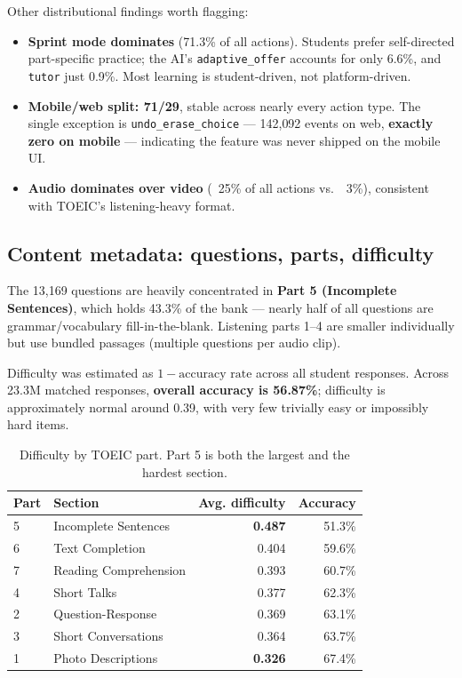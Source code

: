 Other distributional findings worth flagging:

\begin{itemize}
\setlength\itemsep{1pt}
\item \textbf{Sprint mode dominates} (71.3\% of all actions). Students
  prefer self-directed part-specific practice; the AI's
  \texttt{adaptive\_offer} accounts for only 6.6\%, and \texttt{tutor} just
  0.9\%. Most learning is student-driven, not platform-driven.
\item \textbf{Mobile/web split: 71/29}, stable across nearly every
  action type. The single exception is \texttt{undo\_erase\_choice} —
  142{,}092 events on web, \textbf{exactly zero on mobile} — indicating
  the feature was never shipped on the mobile UI.
\item \textbf{Audio dominates over video} (~25\% of all actions vs.\ ~3\%),
  consistent with TOEIC's listening-heavy format.
\end{itemize}

\subsection{Content metadata: questions, parts, difficulty}

The 13{,}169 questions are heavily concentrated in \textbf{Part 5
(Incomplete Sentences)}, which holds 43.3\% of the bank — nearly half of
all questions are grammar/vocabulary fill-in-the-blank. Listening parts
1--4 are smaller individually but use bundled passages (multiple questions
per audio clip).

Difficulty was estimated as $1 - \text{accuracy rate}$ across all student
responses. Across 23.3M matched responses, \textbf{overall accuracy is
56.87\%}; difficulty is approximately normal around 0.39, with very
few trivially easy or impossibly hard items.

\begin{table}[H]
\centering
\small
\begin{tabular}{llrr}
\toprule
Part & Section & Avg. difficulty & Accuracy \\
\midrule
5 & Incomplete Sentences   & \textbf{0.487} & 51.3\% \\
6 & Text Completion        & 0.404 & 59.6\% \\
7 & Reading Comprehension  & 0.393 & 60.7\% \\
4 & Short Talks            & 0.377 & 62.3\% \\
2 & Question-Response      & 0.369 & 63.1\% \\
3 & Short Conversations    & 0.364 & 63.7\% \\
1 & Photo Descriptions     & \textbf{0.326} & 67.4\% \\
\bottomrule
\end{tabular}
\caption{Difficulty by TOEIC part. Part 5 is both the largest and the hardest section.}
\end{table}

